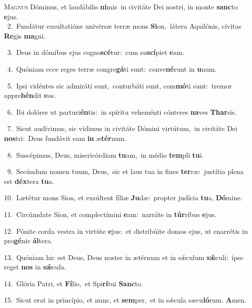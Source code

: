 \lettrine{\initial\textcolor{\initialcolor}{M}}{agnus} Dóminus, et laudábilis \textbf{ni}\-mis~\star in civitáte Dei nostri, in monte \textbf{sanc}\-to \textbf{e}\-jus.\\
{\numbfont\textcolor{\numbcolor}{~2.}}~Fundátur exsultatióne univérsæ terræ mons \textbf{Si}\-on,~\star látera Aquilónis, cívitas \textbf{Re}\-gis \textbf{ma}\-gni.\par
{\numbfont\textcolor{\numbcolor}{~3.}}~Deus in dómibus ejus cogno\-\textbf{scé}\-tur:~\star cum su\-\textbf{scí}\-piet \textbf{e}\-am.\par
{\numbfont\textcolor{\numbcolor}{~4.}}~Quóniam ecce reges terræ congre\-\textbf{gá}\-ti sunt:~\star conve\-\textbf{né}\-runt in \textbf{u}\-num.\par
{\numbfont\textcolor{\numbcolor}{~5.}}~Ipsi vidéntes sic admiráti sunt,~\dagger conturbáti sunt, com\-\textbf{mó}\-ti sunt:~\star tremor appre\-\textbf{hén}\-dit \textbf{e}\-os.\par
{\numbfont\textcolor{\numbcolor}{~6.}}~Ibi dolóres ut parturi\-\textbf{én}\-tis:~\star in spíritu veheménti cónteres \textbf{na}\-ves \textbf{Thar}\-sis.\par
{\numbfont\textcolor{\numbcolor}{~7.}}~Sicut audívimus, sic vídimus in civitáte Dómini virtútum,~\dagger in civitáte Dei \textbf{nos}\-tri:~\star Deus fundávit eam \textbf{in} æ\-\textbf{tér}\-num.\par
{\numbfont\textcolor{\numbcolor}{~8.}}~Suscépimus, Deus, misericórdiam \textbf{tu}\-am,~\star in médio \textbf{tem}\-pli \textbf{tu}\-i.\par
{\numbfont\textcolor{\numbcolor}{~9.}}~Secúndum nomen tuum, Deus,~\dagger sic et laus tua in fines \textbf{ter}\-ræ:~\star justítia plena est \textbf{déx}\-tera \textbf{tu}\-a.\par
{\numbfont\textcolor{\numbcolor}{10.}}~Lætétur mons Sion, et exsúltent fíliæ \textbf{Ju}\-dæ:~\star propter judícia \textbf{tu}\-a, \textbf{Dó}\-mine.\par
{\numbfont\textcolor{\numbcolor}{11.}}~Circúmdate Sion, et complectímini \textbf{e}\-am:~\star narráte in \textbf{túr}\-ribus \textbf{e}\-jus.\par
{\numbfont\textcolor{\numbcolor}{12.}}~Pónite corda vestra in virtúte \textbf{e}\-jus:~\star et distribúite domos ejus, ut enarrétis in pro\-\textbf{gé}\-nie \textbf{ál}\-tera.\par
{\numbfont\textcolor{\numbcolor}{13.}}~Quóniam hic est Deus, Deus noster in ætérnum et in sǽculum \textbf{sǽ}\-culi:~\star ipse reget \textbf{nos} in \textbf{sǽ}\-cula.\par
{\numbfont\textcolor{\numbcolor}{14.}}~Glória Patri, et \textbf{Fí}\-lio,~\star et Spi\-\textbf{rí}\-tui \textbf{Sanc}\-to.\par
{\numbfont\textcolor{\numbcolor}{15.}}~Sicut erat in princípio, et nunc, et \textbf{sem}\-per,~\star et in sǽcula sæcu\-\textbf{ló}\-rum. \textbf{A}\-men.\par
